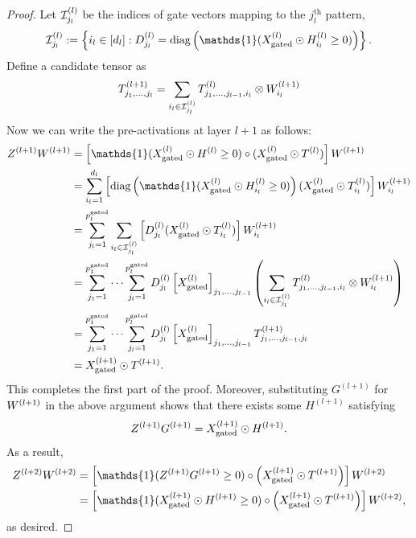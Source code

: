 \begin{proof}
    Let \( \mathcal{I}^{(l)}_{j_l} \) be the indices of gate vectors mapping to the
    \( j_l^{\text{th}} \) pattern,
    \[
        \calI^{(l)}_{j_l}
        := \cbr{ i_l \in [d_l] : \Dl_{j_l} = \diag\rbr{\mathds{1}(\tXl \odot H^{(l)}_{i_l} \geq 0)}}.
    \]
    Define a candidate tensor as
    \[
        T^{(l+1)}_{j_1, \ldots, j_{l}}
        = \sum_{i_l \in \mathcal{I}^{(l)}_{j_l}} T^{(l)}_{j_1, \ldots, j_{l-1}, i_l} \otimes W^{(l+1)}_{i_{l}}
    \]
    Now we can write the pre-activations at layer \( l+1 \) as follows:
    \begin{align*}
        \Zll \Wll
         & = \sbr{\mathds{1}(\tXl \odot H^{(l)} \geq 0) \circ (\tXl \odot \Tl)} \Wll                   \\
         & = \sum_{i_l=1}^{d_l}
        \sbr{\diag\rbr{\mathds{1}(\tXl \odot H_{i_l}^{(l)} \geq 0)} (\tXl \odot \Tl_{i_l})} \Wll_{i_l} \\
         & = \sum_{j_l=1}^{p^{\text{gated}}_l}
        \sum_{i_l \in \calI^{(l)}_{j_l}}
        \sbr{\Dl_{j_l} (\tXl \odot \Tl_{i_l})} \Wll_{i_l}                                              \\
         & = \sum_{j_1=1}^{p^{\text{gated}}_1} \cdots \sum_{j_l=1}^{p^{\text{gated}}_l}
        \Dl_{j_l} \sbr{\tXl}_{j_1, \ldots, j_{l-1}}
        \rbr{\sum_{i_l \in \calI^{(l)}_{j_l}} \Tl_{j_1, \ldots, j_{l-1}, i_l} \otimes \Wll_{i_l}}      \\
         & = \sum_{j_1=1}^{p^{\text{gated}}_1} \cdots \sum_{j_l=1}^{p^{\text{gated}}_l}
        \Dl_{j_l} \sbr{\tXl}_{j_1, \ldots, j_{l-1}} \Tll_{j_1, \ldots, j_{l-1}, j_l}                   \\
         & =  \tXll \odot \Tll.
    \end{align*}
    This completes the first part of the proof.
    Moreover, substituting \( G^{(l+1)} \) for \( W^{(l+1)} \) in the above
    argument shows that there exists some \( H^{(l+1)} \) satisfying
    \[
        Z^{(l+1)} G^{(l+1)} = X^{(l+1)}_{\text{gated}} \odot H^{(l+1)}.
    \]
    As a result,
    \begin{align*}
        Z^{(l+2)} W^{(l+2)}
         & = \sbr{\mathds{1}(\Zll G^{(l+1)} \geq 0) \circ \rbr{\tXll \odot \Tll}} W^{(l+2)}         \\
         & = \sbr{\mathds{1}(\tXll \odot H^{(l+1)} \geq 0) \circ \rbr{\tXll \odot \Tll}} W^{(l+2)},
    \end{align*}
    as desired.
\end{proof}


